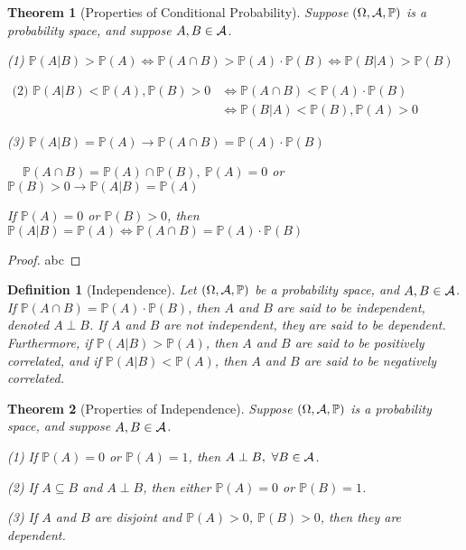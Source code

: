 \documentclass[openany,12pt]{book}
\newtheorem{theorem}{Theorem}[chapter]
\newtheorem{definition}{Definition}[chapter]
\begin{document}
\begin{theorem}[Properties of Conditional Probability]
Suppose $(\Omega,\mathcal{A},\mathbb{P})$ is a probability space, and suppose $A,B\in\mathcal{A}$.

(1) $\mathbb{P}(A|B)>\mathbb{P}(A)\Leftrightarrow \mathbb{P}(A\cap B)>\mathbb{P}(A)\cdot \mathbb{P}(B)\Leftrightarrow \mathbb{P}(B|A)>\mathbb{P}(B)$

 $\begin{aligned}
\text{(2) }\mathbb{P}(A|B)<\mathbb{P}(A),\mathbb{P}(B)>0&\Leftrightarrow \mathbb{P}\left(A\cap B\right)<\mathbb{P}(A)\cdot \mathbb{P}(B)\\
                              &\Leftrightarrow \mathbb{P}(B|A)<\mathbb{P}(B),\mathbb{P}(A)>0
                                     \end{aligned}$
                                                          
(3) $\mathbb{P}(A|B)=\mathbb{P}(A)\to \mathbb{P}(A\cap B)=\mathbb{P}(A)\cdot \mathbb{P}(B)$

    $\quad\ \mathbb{P}(A\cap B)=\mathbb{P}(A)\cap \mathbb{P}(B),\ \mathbb{P}(A)=0$ or $\mathbb{P}(B)>0\to \mathbb{P}(A|B)=\mathbb{P}(A)$
    
If $\mathbb{P}(A)=0$ or $\mathbb{P}(B)>0$, then $\mathbb{P}(A|B)=\mathbb{P}(A)\Leftrightarrow \mathbb{P}(A\cap B)=\mathbb{P}(A)\cdot \mathbb{P}(B)  $

\end{theorem}

\begin{proof}
  abc
\end{proof}

\begin{definition}[Independence]
Let $(\Omega,\mathcal{A},\mathbb{P})$ be a probability space, and $A,B\in\mathcal{A}$. 
If $\mathbb{P}(A\cap B)=\mathbb{P}(A)\cdot \mathbb{P}(B)$, then $A$ and $B$ are said to be independent, denoted $A\perp B$. If $A$ and $B$ are not independent, they are said to be dependent. 
Furthermore, if $\mathbb{P}(A|B)>\mathbb{P}(A)$, then $A$ and $B$ are said to be positively correlated, and if $\mathbb{P}(A|B)<\mathbb{P}(A)$, then $A$ and $B$ are said to be negatively correlated.
\end{definition}

\begin{theorem}[Properties of Independence]
Suppose $(\Omega,\mathcal{A},\mathbb{P})$ is a probability space, and suppose  $A,B\in\mathcal{A}$.

(1) If $\mathbb{P}(A)=0$ or $\mathbb{P}(A)=1$, then $A\perp B,\ \forall B\in\mathcal{A}$.

(2) If $A\subseteq B$ and $A\perp B$, then either $\mathbb{P}(A)=0$ or $\mathbb{P}(B)=1$.

(3) If $A$ and $B$ are disjoint and $\mathbb{P}(A)>0$, $\mathbb{P}(B)>0$, then they are dependent.

\end{theorem}
\end{document}
